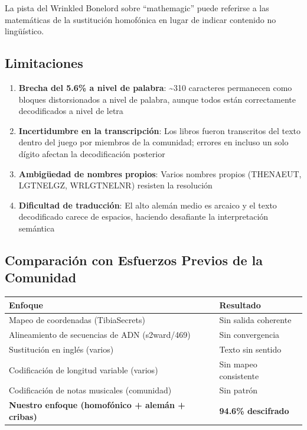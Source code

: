 \documentclass[11pt,a4paper]{article}
\begin{document}
La pista del Wrinkled Bonelord sobre ``mathemagic'' puede referirse a las matem\'{a}ticas de la sustituci\'{o}n homof\'{o}nica en lugar de indicar contenido no ling\"{u}\'{i}stico.

\subsection{Limitaciones}

\begin{enumerate}
\item \textbf{Brecha del 5.6\% a nivel de palabra}: \~{}310 caracteres permanecen como bloques distorsionados a nivel de palabra, aunque todos est\'{a}n correctamente decodificados a nivel de letra
\item \textbf{Incertidumbre en la transcripci\'{o}n}: Los libros fueron transcritos del texto dentro del juego por miembros de la comunidad; errores en incluso un solo d\'{i}gito afectan la decodificaci\'{o}n posterior
\item \textbf{Ambig\"{u}edad de nombres propios}: Varios nombres propios (THENAEUT, LGTNELGZ, WRLGTNELNR) resisten la resoluci\'{o}n
\item \textbf{Dificultad de traducci\'{o}n}: El alto alem\'{a}n medio es arcaico y el texto decodificado carece de espacios, haciendo desafiante la interpretaci\'{o}n sem\'{a}ntica
\end{enumerate}

\subsection{Comparaci\'{o}n con Esfuerzos Previos de la Comunidad}

\begin{table}[h]
\centering
\begin{tabular}{ll}
\toprule
Enfoque & Resultado \\
\midrule
Mapeo de coordenadas (TibiaSecrets) & Sin salida coherente \\
Alineamiento de secuencias de ADN (s2ward/469) & Sin convergencia \\
Sustituci\'{o}n en ingl\'{e}s (varios) & Texto sin sentido \\
Codificaci\'{o}n de longitud variable (varios) & Sin mapeo consistente \\
Codificaci\'{o}n de notas musicales (comunidad) & Sin patr\'{o}n \\
\textbf{Nuestro enfoque (homof\'{o}nico + alem\'{a}n + cribas)} & \textbf{94.6\% descifrado} \\
\bottomrule
\end{tabular}
\end{table}
\end{document}
